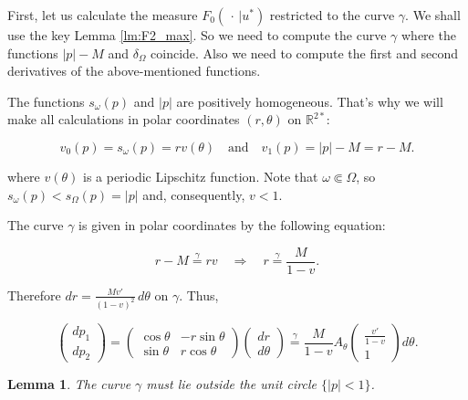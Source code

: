 \documentclass[14pt]{extarticle}
\newcommand{\R}{\mathbb{R}}
\newtheorem{lemma}{Lemma}
\theoremstyle{remark}
\theoremstyle{definition}
\begin{document}
First, let us calculate the measure $F_0(\,\cdot\,|u^*)$ restricted to the curve $\gamma$. We shall use the key Lemma \ref{lm:F2_max}. So we need to compute the curve $\gamma$ where the functions $|p|-M$ and $\delta_\Omega$ coincide. Also we need to compute the first and second derivatives of the above-mentioned functions.

The functions $s_\omega(p)$ and $|p|$ are positively homogeneous. That's why we will make all calculations in polar coordinates $(r,\theta)$ on $\R^{2*}$:

\[
	v_0(p)=s_\omega(p) = rv(\theta)\quad\mbox{and}\quad v_1(p) = |p|-M = r-M.
\]

\noindent where $v(\theta)$ is a periodic Lipschitz function. Note that $\omega\Subset \Omega$, so $s_\omega(p)<s_\Omega(p)=|p|$ and, consequently, $v<1$.

The curve $\gamma$ is given in polar coordinates by the following equation:

\[
	r-M \stackrel{\gamma}{=} rv\quad\Rightarrow\quad r\stackrel{\gamma}{=}\frac{M}{1-v}.
\]

\noindent Therefore $dr=\frac{Mv'}{(1-v)^2}\,d\theta$ on $\gamma$. Thus,

\begin{equation}
\label{eq:heel_dp_gamma}
	\left(\begin{array}{c}
		dp_1\\
		dp_2
	\end{array}\right)=
	\left(\begin{array}{rr}
		\cos\theta&-r\sin\theta\\
		\sin\theta&r\cos\theta
	\end{array}\right)
	\left(\begin{array}{c}
		dr\\d\theta
	\end{array}\right)
	\stackrel{\gamma}{=}
	\frac{M}{1-v}A_\theta
	\left(\begin{array}{c}
		\frac{v'}{1-v}\\
		1
	\end{array}\right)
	d\theta.
\end{equation}

\begin{lemma}
\label{lm:r_ge_1_on_gamma}
	The curve $\gamma$ must lie outside the unit circle $\{|p|<1\}$.
\end{lemma}
\end{document}
